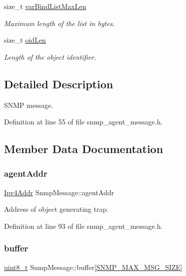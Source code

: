 \begin{DoxyCompactItemize}
size\+\_\+t \hyperlink{structSnmpMessage_a926db41b5b7d0a3bc6394ebb63c310b0}{var\+Bind\+List\+Max\+Len}
\begin{DoxyCompactList}\small\item\em Maximum length of the list in bytes. \end{DoxyCompactList}\item 
size\+\_\+t \hyperlink{structSnmpMessage_a91aaa1028c1cec2114812bec3ba91e2e}{oid\+Len}
\begin{DoxyCompactList}\small\item\em Length of the object identifier. \end{DoxyCompactList}\end{DoxyCompactItemize}


\subsection{Detailed Description}
S\+N\+MP message. 

Definition at line 55 of file snmp\+\_\+agent\+\_\+message.\+h.



\subsection{Member Data Documentation}
\mbox{\label{structSnmpMessage_a3c51309a93e0740209c2ee75307c0f04}} 
\subsubsection{\texorpdfstring{agent\+Addr}{agentAddr}}
{\footnotesize\ttfamily \hyperlink{ipv4_8h_a411debb3d770caa0c06d3f73367da37f}{Ipv4\+Addr} Snmp\+Message\+::agent\+Addr}



Address of object generating trap. 



Definition at line 93 of file snmp\+\_\+agent\+\_\+message.\+h.

\mbox{\label{structSnmpMessage_a60405510f10de109ac78bf7ae8427f24}} 
\subsubsection{\texorpdfstring{buffer}{buffer}}
{\footnotesize\ttfamily \hyperlink{stdint_8h_aba7bc1797add20fe3efdf37ced1182c5}{uint8\+\_\+t} Snmp\+Message\+::buffer\mbox{[}\hyperlink{snmp__common_8h_af5a22cbaa4973c106e664d5d01316fae}{S\+N\+M\+P\+\_\+\+M\+A\+X\+\_\+\+M\+S\+G\+\_\+\+S\+I\+ZE}\mbox{]}}



